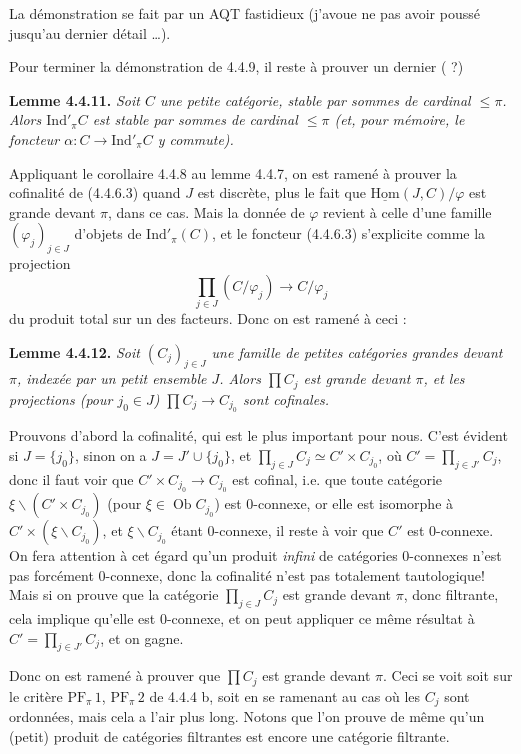 \documentclass[11pt]{article}
\newcommand{\printedpage}[1]{\marginpar{\footnotesize p.~#1}}
\newcommand{\msp}[1]{\marginpar{\footnotesize [#1]}}
\newcommand{\uHom}{\underline{\mathrm{Hom}}}
\newcommand{\Ind}{\mathrm{Ind}}
\newcommand{\Ob}{\operatorname{Ob}}
\begin{document}
\msp{page 92}
La démonstration se fait par un AQT fastidieux (j'avoue ne pas avoir poussé jusqu'au dernier détail \ldots).

Pour terminer la démonstration de 4.4.9, il reste à prouver un dernier ( ?)

\textbf{Lemme 4.4.11.} \textit{Soit $C$ une petite catégorie, stable par sommes de cardinal $\leqslant \pi$. Alors $\Ind'_\pi C$ est stable par sommes de cardinal $\leqslant \pi$ (et, pour mémoire, le foncteur $\alpha : C \longrightarrow \Ind'_\pi C$ y commute).}

Appliquant le corollaire 4.4.8 au lemme 4.4.7, on est ramené à prouver la cofinalité de (4.4.6.3) quand $J$ est discrète, plus le fait que $\uHom(J,C)/\varphi$ est grande devant $\pi$, dans ce cas. Mais la donnée de $\varphi$ revient à celle d'une famille $(\varphi_j)_{j\in J}$ d'objets de $\Ind'_\pi(C)$, et le foncteur (4.4.6.3) s'explicite comme la projection
\[
\prod_{j\in J} (C/\varphi_j) \longrightarrow C/\varphi_j
\]
du produit total sur un des facteurs. Donc on est ramené à ceci :

\msp{page 93}
\textbf{Lemme 4.4.12.} \textit{Soit $(C_j)_{j\in J}$ une famille de petites catégories grandes devant $\pi$, indexée par un petit ensemble $J$. Alors $\prod C_j$ est grande devant $\pi$, et les projections (pour $j_0 \in J$) $\prod C_j \longrightarrow C_{j_0}$ sont cofinales.}

Prouvons d'abord la cofinalité, qui est le plus important pour nous. C'est évident si $J = \{j_0\}$, sinon on a $J = J' \cup \{j_0\}$, et $\prod_{j\in J} C_j \simeq C' \times C_{j_0}$, où $C' = \prod_{j\in J'} C_j$, donc il faut voir que $C' \times C_{j_0} \longrightarrow C_{j_0}$ est cofinal, i.e. que toute catégorie $\xi\backslash(C' \times C_{j_0})$ (pour $\xi \in \Ob C_{j_0}$) est 0-connexe, or elle est isomorphe à $C' \times (\xi\backslash C_{j_0})$, et $\xi\backslash C_{j_0}$ étant 0-connexe, il reste à voir que $C'$ est 0-connexe. On fera attention à cet égard qu'un produit \textit{infini} de catégories 0-connexes n'est pas forcément 0-connexe, donc la cofinalité n'est pas totalement tautologique! Mais si on prouve que la catégorie $\prod_{j\in J} C_j$ est
\printedpage{23}
\msp{page 94}
grande devant $\pi$, donc filtrante, cela implique qu'elle est 0-connexe, et on peut appliquer ce même résultat à $C' = \prod_{j\in J'} C_j$, et on gagne.

Donc on est ramené à prouver que $\prod C_j$ est grande devant $\pi$. Ceci se voit soit sur le critère $\mathrm{PF}_\pi\,1$, $\mathrm{PF}_\pi\,2$ de 4.4.4 b, soit en se ramenant au cas où les $C_j$ sont ordonnées, mais cela a l'air plus long. Notons que l'on prouve de même qu'un (petit) produit de catégories filtrantes est encore une catégorie filtrante.
\end{document}

